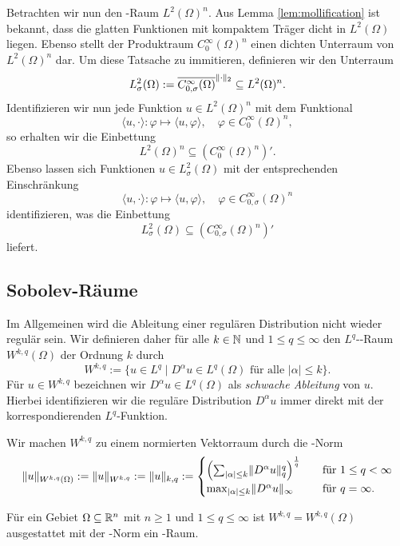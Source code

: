 Betrachten wir nun den \hilbert\hyp{}Raum $L^2(\Omega)^n$.
Aus Lemma \ref{lem:mollification} ist bekannt, dass die glatten Funktionen mit kompaktem Träger dicht in $L^2(\Omega)$ liegen. 
Ebenso stellt der Produktraum $C_0^\infty(\Omega)^n$ einen dichten Unterraum von $L^2(\Omega)^n$ dar.
Um diese Tatsache zu immitieren, definieren wir den Unterraum 
$$
  L^2_\sigma(\Omega) 
  := \overline{C_{0,\sigma}^\infty(\Omega)}^{\lVert \cdot \rVert_2}
  \subseteq L^2(\Omega)^n.
$$
Identifizieren wir nun jede Funktion $u \in L^2(\Omega)^n$ mit dem Funktional
$$
\langle u, \cdot \rangle \colon \varphi \mapsto \langle u, \varphi \rangle, \quad \varphi \in C_0^\infty(\Omega)^n,
$$
so erhalten wir die Einbettung 
$$
  L^2(\Omega)^n \subseteq (C_0^\infty(\Omega)^n)'.
$$
Ebenso lassen sich Funktionen $u \in L^2_\sigma(\Omega)$ mit der entsprechenden Einschränkung
$$
\langle u, \cdot \rangle \colon \varphi \mapsto \langle u, \varphi \rangle, \quad \varphi \in C_{0,\sigma}^\infty(\Omega)^n
$$
identifizieren, was die Einbettung
$$
  L^2_\sigma(\Omega) \subseteq (C_{0,\sigma}^\infty(\Omega)^n)'
$$
liefert.

\subsection{Sobolev-Räume}

Im Allgemeinen wird die Ableitung einer regulären Distribution nicht wieder regulär sein.
Wir definieren daher für alle $k \in \mathbb{N}$ und $1 \leq q \leq \infty$ den $L^q$\hyp{}\sobolev\hyp{}Raum $W^{k,q}(\Omega)$ der Ordnung $k$ durch
$$
W^{k,q} := \{ u \in L^q \mid D^\alpha u \in L^q(\Omega) \text{ für alle } |\alpha| \leq k\}.
$$
Für $u \in W^{k,q}$ bezeichnen wir $D^\alpha u \in L^q(\Omega)$ als \emph{schwache Ableitung} von $u$.
Hierbei identifizieren wir die reguläre Distribution $D^\alpha u$ immer direkt mit der korrespondierenden $L^q$\hyp{}Funktion.

Wir machen $W^{k,q}$ zu einem normierten Vektorraum durch die \sobolev\hyp{}Norm
$$
  \lVert u \rVert_{W^{k,q}(\Omega)} 
  := \lVert u \rVert_{W^{k,q}} 
  := \lVert u \rVert_{k,q} 
  := \begin{cases} 
    \left(\sum_{|\alpha| \leq k} \lVert D^\alpha u \rVert_q^q \right)^\frac{1}{q}\quad&\text{für } 1 \leq q < \infty \\
    \max_{|\alpha| \leq k} \lVert D^\alpha u \rVert_\infty \quad&\text{für }q = \infty.
    \end{cases}
$$

\begin{lem}
  Für ein Gebiet $\Omega \subseteq \mathbb{R}^n$ mit $n \geq 1$ und $1 \leq q \leq \infty$ ist $W^{k,q} = W^{k,q}(\Omega)$ ausgestattet mit der \sobolev\hyp{}Norm ein \banach\hyp{}Raum.
\end{lem}

